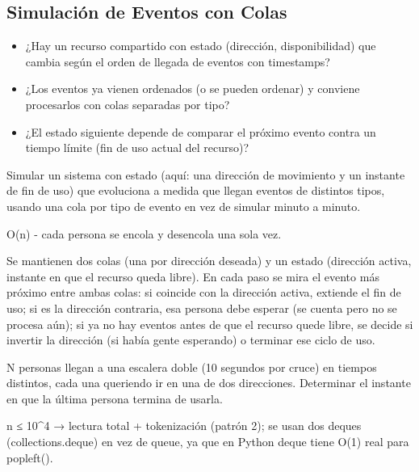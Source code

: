 \subsection{Simulación de Eventos con Colas}


\begin{itemize}
\item ¿Hay un recurso compartido con estado (dirección, disponibilidad) que cambia según el orden de llegada de eventos con timestamps?
\item ¿Los eventos ya vienen ordenados (o se pueden ordenar) y conviene procesarlos con colas separadas por tipo?
\item ¿El estado siguiente depende de comparar el próximo evento contra un tiempo límite (fin de uso actual del recurso)?
\end{itemize}

 Simular un sistema con estado (aquí: una dirección de movimiento y un instante de fin de uso) que evoluciona a medida que llegan eventos de distintos tipos, usando una cola por tipo de evento en vez de simular minuto a minuto.

 O(n) - cada persona se encola y desencola una sola vez.

 Se mantienen dos colas (una por dirección deseada) y un estado (dirección activa, instante en que el recurso queda libre). En cada paso se mira el evento más próximo entre ambas colas: si coincide con la dirección activa, extiende el fin de uso; si es la dirección contraria, esa persona debe esperar (se cuenta pero no se procesa aún); si ya no hay eventos antes de que el recurso quede libre, se decide si invertir la dirección (si había gente esperando) o terminar ese ciclo de uso.


N personas llegan a una escalera doble (10 segundos por cruce) en tiempos distintos, cada una queriendo ir en una de dos direcciones. Determinar el instante en que la última persona termina de usarla.

 n ≤ 10\textasciicircum{}4 → lectura total + tokenización (patrón 2); se usan dos deques (collections.deque) en vez de queue, ya que en Python deque tiene O(1) real para popleft().


